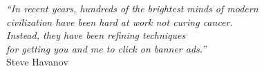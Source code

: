 \cleardoublepage
\thispagestyle{plain}

\vspace*{8cm}


\begin{flushright}
    \textsl{``In recent years, hundreds of the brightest minds of modern \\
        civilization have been hard at work not curing cancer. \\
         Instead, they have been refining techniques \\
         for getting you and me to click on banner ads.''} \\
    \vspace*{1.5cm}
    Steve Havanov
\end{flushright}
